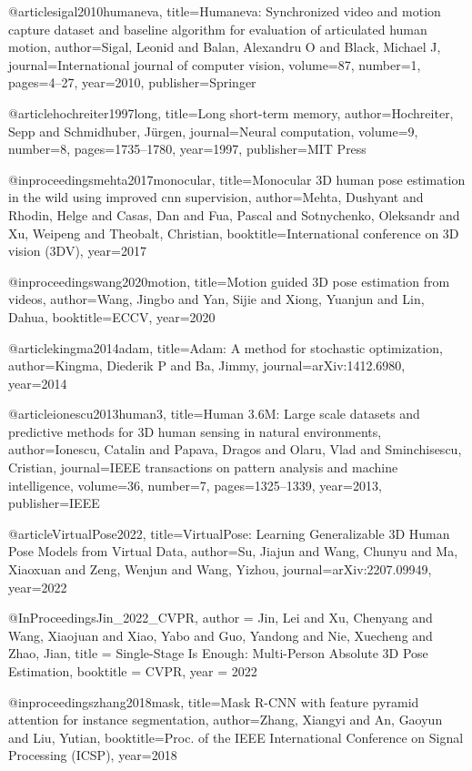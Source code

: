@article{sigal2010humaneva,
  title={Humaneva: Synchronized video and motion capture dataset and baseline algorithm for evaluation of articulated human motion},
  author={Sigal, Leonid and Balan, Alexandru O and Black, Michael J},
  journal={International journal of computer vision},
  volume={87},
  number={1},
  pages={4--27},
  year={2010},
  publisher={Springer}
}

@article{hochreiter1997long,
  title={Long short-term memory},
  author={Hochreiter, Sepp and Schmidhuber, J{\"u}rgen},
  journal={Neural computation},
  volume={9},
  number={8},
  pages={1735--1780},
  year={1997},
  publisher={MIT Press}
}

@inproceedings{mehta2017monocular,
  title={Monocular {3D} human pose estimation in the wild using improved cnn supervision},
  author={Mehta, Dushyant and Rhodin, Helge and Casas, Dan and Fua, Pascal and Sotnychenko, Oleksandr and Xu, Weipeng and Theobalt, Christian},
  booktitle={International conference on 3D vision (3DV)},
  year={2017}
}

@inproceedings{wang2020motion,
  title={Motion guided {3D} pose estimation from videos},
  author={Wang, Jingbo and Yan, Sijie and Xiong, Yuanjun and Lin, Dahua},
  booktitle=ECCV,
  year={2020}
}

@article{kingma2014adam,
  title={Adam: A method for stochastic optimization},
  author={Kingma, Diederik P and Ba, Jimmy},
  journal={arXiv:1412.6980},
  year={2014}
}

@article{ionescu2013human3,
  title={Human 3.6{M}: Large scale datasets and predictive methods for {3D} human sensing in natural environments},
  author={Ionescu, Catalin and Papava, Dragos and Olaru, Vlad and Sminchisescu, Cristian},
  journal={IEEE transactions on pattern analysis and machine intelligence},
  volume={36},
  number={7},
  pages={1325--1339},
  year={2013},
  publisher={IEEE}
}

@article{VirtualPose2022,
  title={{V}irtual{P}ose: Learning Generalizable 3D Human Pose Models from Virtual Data},
  author={Su, Jiajun and Wang, Chunyu and Ma, Xiaoxuan and Zeng, Wenjun and Wang, Yizhou},
  journal={arXiv:2207.09949},
  year={2022}
}

@InProceedings{Jin_2022_CVPR,
    author    = {Jin, Lei and Xu, Chenyang and Wang, Xiaojuan and Xiao, Yabo and Guo, Yandong and Nie, Xuecheng and Zhao, Jian},
    title     = {Single-Stage Is Enough: Multi-Person Absolute {3D} Pose Estimation},
    booktitle = CVPR,
    year      = {2022}
}

@inproceedings{zhang2018mask,
  title={Mask {R-CNN} with feature pyramid attention for instance segmentation},
  author={Zhang, Xiangyi and An, Gaoyun and Liu, Yutian},
  booktitle={Proc. of the IEEE International Conference on Signal Processing (ICSP)},
  year={2018}
}

